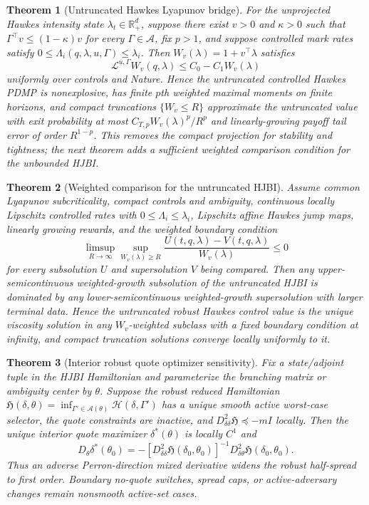 \documentclass[11pt]{article}
\newtheorem{theorem}{Theorem}
\newcommand{\R}{\mathbb{R}}
\begin{document}
\begin{theorem}[Untruncated Hawkes Lyapunov bridge]
For the unprojected Hawkes intensity state $\lambda_t\in\R_+^d$, suppose there
exist $v>0$ and $\kappa>0$ such that
$\Gamma^\top v\le(1-\kappa)v$ for every
$\Gamma\in\mathcal A$, fix $p>1$, and suppose controlled mark rates satisfy
$0\le\Lambda_i(q,\lambda,u,\Gamma)\le \lambda_i$. Then
$W_v(\lambda)=1+v^\top\lambda$ satisfies
\[
\mathcal L^{u,\Gamma}W_v(q,\lambda)
\le C_0-C_1W_v(\lambda)
\]
uniformly over controls and Nature. Hence the untruncated controlled Hawkes
PDMP is nonexplosive, has finite $p$th weighted maximal moments on finite
horizons, and compact truncations $\{W_v\le R\}$ approximate the untruncated
value with exit probability at most $C_{T,p}W_v(\lambda)^p/R^p$ and
linearly-growing payoff tail error of order $R^{1-p}$. This removes the compact
projection for stability and tightness; the next theorem adds a sufficient
weighted comparison condition for the unbounded HJBI.
\end{theorem}

\begin{theorem}[Weighted comparison for the untruncated HJBI]
Assume common Lyapunov subcriticality, compact controls and ambiguity,
continuous locally Lipschitz controlled rates with
$0\le\Lambda_i\le\lambda_i$, Lipschitz affine Hawkes jump maps, linearly
growing rewards, and the weighted boundary condition
\[
\limsup_{R\to\infty}
\sup_{W_v(\lambda)\ge R}
\frac{U(t,q,\lambda)-V(t,q,\lambda)}{W_v(\lambda)}\le 0
\]
for every subsolution $U$ and supersolution $V$ being compared. Then any
upper-semicontinuous weighted-growth subsolution of the untruncated HJBI is
dominated by any lower-semicontinuous weighted-growth supersolution with larger
terminal data. Hence the untruncated robust Hawkes control value is the unique
viscosity solution in any $W_v$-weighted subclass with a fixed boundary
condition at infinity, and compact truncation solutions converge locally
uniformly to it.
\end{theorem}

\begin{theorem}[Interior robust quote optimizer sensitivity]
Fix a state/adjoint tuple in the HJBI Hamiltonian and parameterize the
branching matrix or ambiguity center by $\theta$. Suppose the robust reduced
Hamiltonian
$\mathfrak H(\delta,\theta)=\inf_{\Gamma'\in\mathcal A(\theta)}
\mathcal H(\delta,\Gamma')$ has a unique smooth active worst-case selector,
the quote constraints are inactive, and
$D^2_{\delta\delta}\mathfrak H\preceq -mI$ locally. Then the unique interior
quote maximizer $\delta^*(\theta)$ is locally $C^1$ and
\[
D_\theta\delta^*(\theta_0)=
-\left[D^2_{\delta\delta}\mathfrak H(\delta_0,\theta_0)\right]^{-1}
D^2_{\delta\theta}\mathfrak H(\delta_0,\theta_0).
\]
Thus an adverse Perron-direction mixed derivative widens the robust
half-spread to first order. Boundary no-quote switches, spread caps, or
active-adversary changes remain nonsmooth active-set cases.
\end{theorem}
\end{document}
